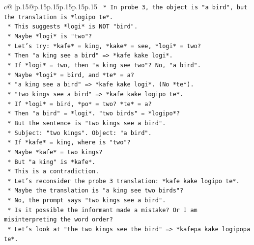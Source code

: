 \documentclass{article}
\begin{document}
{\begin{supertabular}{c@{$\;$}|p{.15\linewidth}@{}p{.15\linewidth}p{.15\linewidth}p{.15\linewidth}p{.15\linewidth}p{.15\linewidth}}
{{{\texttt{                *   In probe 3, the object is "a bird", but the translation is *logipo te*.} \\
\texttt{                *   This suggests *logi* is NOT "bird".} \\
\texttt{                *   Maybe *logi* is "two"?} \\
\texttt{                *   Let's try: *kafe* = king, *kake* = see, *logi* = two?} \\
\texttt{                *   Then "a king see a bird" => *kafe kake logi*.} \\
\texttt{                    *   If *logi* = two, then "a king see two"? No, "a bird".} \\
\texttt{                *   Maybe *logi* = bird, and *te* = a?} \\
\texttt{                *   "a king see a bird" => *kafe kake logi*. (No *te*).} \\
\texttt{                *   "two kings see a bird" => *kafe kake logipo te*.} \\
\texttt{                    *   If *logi* = bird, *po* = two? *te* = a?} \\
\texttt{                    *   Then "a bird" = *logi*. "two birds" = *logipo*?} \\
\texttt{                    *   But the sentence is "two kings see a bird".} \\
\texttt{                    *   Subject: "two kings". Object: "a bird".} \\
\texttt{                    *   If *kafe* = king, where is "two"?} \\
\texttt{                    *   Maybe *kafe* = two kings?} \\
\texttt{                    *   But "a king" is *kafe*.} \\
\texttt{                    *   This is a contradiction.} \\
\texttt{                *   Let's reconsider the probe 3 translation: *kafe kake logipo te*.} \\
\texttt{                *   Maybe the translation is "a king see two birds"?} \\
\texttt{                *   No, the prompt says "two kings see a bird".} \\
\texttt{                *   Is it possible the informant made a mistake? Or I am misinterpreting the word order?} \\
\texttt{                *   Let's look at "the two kings see the bird" => *kafepa kake logipopa te*.} \\
}}}
\end{supertabular}}
\end{document}
